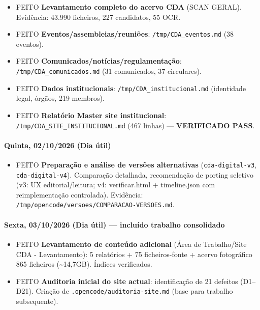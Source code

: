 \begin{itemize}
\tightlist
\item
  {FEITO} \textbf{Levantamento completo do acervo CDA} (SCAN GERAL).
  Evidência: 43.990 ficheiros, 227 candidatos, 55 OCR.
\item
  {FEITO} \textbf{Eventos/assembleias/reuniões}:
  \texttt{/tmp/CDA\_eventos.md} (38 eventos).
\item
  {FEITO} \textbf{Comunicados/notícias/regulamentação}:
  \texttt{/tmp/CDA\_comunicados.md} (31 comunicados, 37 circulares).
\item
  {FEITO} \textbf{Dados institucionais}:
  \texttt{/tmp/CDA\_institucional.md} (identidade legal, órgãos, 219
  membros).
\item
  {FEITO} \textbf{Relatório Master site institucional}:
  \texttt{/tmp/CDA\_SITE\_INSTITUCIONAL.md} (467 linhas) ---
  \textbf{VERIFICADO PASS}.
\end{itemize}

\paragraph{Quinta, 02/10/2026 (Dia
útil)}\label{quinta-02102026-dia-uxfatil}

\begin{itemize}
\tightlist
\item
  {FEITO} \textbf{Preparação e análise de versões alternativas}
  (\texttt{cda-digital-v3}, \texttt{cda-digital-v4}). Comparação
  detalhada, recomendação de porting seletivo (v3: UX editorial/leitura;
  v4: verificar.html + timeline.json com reimplementação controlada).
  Evidência: \texttt{/tmp/opencode/versoes/COMPARACAO-VERSOES.md}.
\end{itemize}

\paragraph{Sexta, 03/10/2026 (Dia útil) --- incluído trabalho
consolidado}\label{sexta-03102026-dia-uxfatil-incluuxeddo-trabalho-consolidado}

\begin{itemize}
\tightlist
\item
  {FEITO} \textbf{Levantamento de conteúdo adicional} (Área de
  Trabalho/Site CDA - Levantamento): 5 relatórios + 75 ficheiros-fonte +
  acervo fotográfico 865 ficheiros (\textasciitilde14,7GB). Índices
  verificados.
\item
  {FEITO} \textbf{Auditoria inicial do site actual}: identificação de 21
  defeitos (D1--D21). Criação de \texttt{.opencode/auditoria-site.md}
  (base para trabalho subsequente).
\end{itemize}

